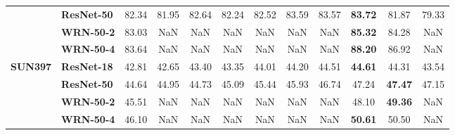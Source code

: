 \begin{table}
\begin{tabular}{l|l|cccccccccc}
       & \textbf{ResNet-50} &             82.34 & 81.95 & 82.64 & 82.24 & 82.52 & 83.59 & 83.57 & \textbf{83.72} & 81.87 & 79.33 \\
       & \textbf{WRN-50-2} &             83.03 &   NaN &   NaN &   NaN &   NaN &   NaN &   NaN & \textbf{85.32} & 84.28 &   NaN \\
       & \textbf{WRN-50-4} &             83.64 &   NaN &   NaN &   NaN &   NaN &   NaN &   NaN & \textbf{88.20} & 86.92 &   NaN \\
\cline{1-12}
\multirow{4}{*}{\textbf{SUN397}} & \textbf{ResNet-18} &             42.81 & 42.65 & 43.40 & 43.35 & 44.01 & 44.20 & 44.51 & \textbf{44.61} & 44.31 & 43.54 \\
       & \textbf{ResNet-50} &             44.64 & 44.95 & 44.73 & 45.09 & 45.44 & 45.93 & 46.74 & 47.24 & \textbf{47.47} & 47.15 \\
       & \textbf{WRN-50-2} &             45.51 &   NaN &   NaN &   NaN &   NaN &   NaN &   NaN & 48.10 & \textbf{49.36} &   NaN \\
       & \textbf{WRN-50-4} &             46.10 &   NaN &   NaN &   NaN &   NaN &   NaN &   NaN & \textbf{50.61} & 50.50 &   NaN \\
\bottomrule
\end{tabular}
\end{table}
